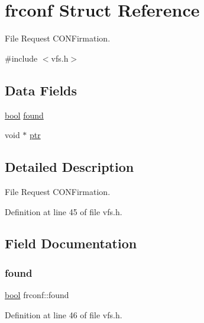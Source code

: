 \hypertarget{a00324}{}\section{frconf Struct Reference}
\label{a00324}


File Request C\+O\+N\+Firmation.  




{\ttfamily \#include $<$vfs.\+h$>$}

\subsection*{Data Fields}
\begin{DoxyCompactItemize}
\item 
\hyperlink{a00140_af6a258d8f3ee5206d682d799316314b1_af6a258d8f3ee5206d682d799316314b1}{bool} \hyperlink{a00324_aadd5ca2c6b0ddfb40e058f420907fd7d_aadd5ca2c6b0ddfb40e058f420907fd7d}{found}
\item 
void $\ast$ \hyperlink{a00324_ad00ee8a5532f1cb73a4cc2faa80afac8_ad00ee8a5532f1cb73a4cc2faa80afac8}{ptr}
\end{DoxyCompactItemize}


\subsection{Detailed Description}
File Request C\+O\+N\+Firmation. 

Definition at line 45 of file vfs.\+h.



\subsection{Field Documentation}
\mbox{\label{a00324_aadd5ca2c6b0ddfb40e058f420907fd7d_aadd5ca2c6b0ddfb40e058f420907fd7d}} 
\subsubsection{\texorpdfstring{found}{found}}
{\footnotesize\ttfamily \hyperlink{a00140_af6a258d8f3ee5206d682d799316314b1_af6a258d8f3ee5206d682d799316314b1}{bool} frconf\+::found}



Definition at line 46 of file vfs.\+h.

\mbox{\label{a00324_ad00ee8a5532f1cb73a4cc2faa80afac8_ad00ee8a5532f1cb73a4cc2faa80afac8}} 
